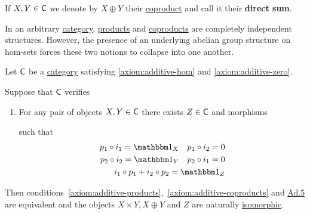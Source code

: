 \documentclass[../../main]{subfiles}
\begin{document}
\begin{notation}\label{def:direct-sum}
  If \(X, Y \in \mathsf{C}\) we denote by \(X \oplus Y\) their \hyperref[def:categorical-coproduct]{coproduct} and call it their \textbf{direct sum}.
\end{notation}

In an arbitrary \hyperref[def:category]{category}, \hyperref[def:categorical-product]{products} and \hyperref[def:categorical-coproduct]{coproducts} are completely independent structures.
However, the presence of an underlying abelian group structure on hom-sets forces these two notions to collapse into one another.
\begin{lemma}\label{lemma:products-coproducts-additive-category}
  Let \(\mathsf{C}\) be a \hyperref[def:category]{category} satisfying \ref{axiom:additive-hom} and \ref{axiom:additive-zero}.

  Suppose that \(\mathsf{C}\) verifies
  \begin{enumerate}
    \item[Ad.5)]\label{axiom:additive-morphisms} For any pair of objects \(X, Y \in \mathsf{C}\) there exists \(Z \in \mathsf{C}\) and morphisms
          \begin{center}
          \end{center}
          such that
          \begin{align*}
            p_{1} \circ i_{1} = \id_{X} \quad p_{1} \circ i_{2} = 0 \\
            p_{2} \circ i_{2} = \id_{Y} \quad p_{2} \circ i_{1} = 0 \\
            i_{1} \circ p_{1} + i_{2} \circ p_{2} = \id_{Z}
          \end{align*}
  \end{enumerate}
  Then conditions~\ref{axiom:additive-products},~\ref{axiom:additive-coproducts} and \hyperref[axiom:additive-morphisms]{Ad.5} are equivalent and the objects \(X \times Y, X \oplus Y\) and \(Z\) are naturally \hyperref[def:categorical-isomorphism]{isomorphic}.
\end{lemma}
\end{document}
